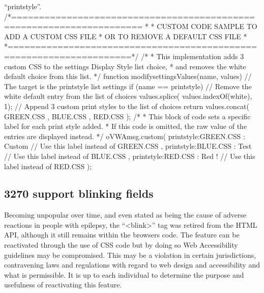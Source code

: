 \documentclass[letterpaper,10pt,english]{sphinxmanual}
\begin{document}
\begin{sphinxVerbatim}[commandchars=\\\{\}]
“printstyle”.
/*=====================================================================
*
* CUSTOM CODE SAMPLE TO ADD A CUSTOM CSS FILE
* OR TO REMOVE A DEFAULT CSS FILE
*
*====================================================================*/
/*
* This implementation adds 3 custom CSS to the settings \PYGZdq{}Display Style\PYGZdq{} list choice,
* and removes the \PYGZdq{}white\PYGZdq{} default choice from this list.
*/
function modify\PYGZus{}settingsValues(name, values) \PYGZob{}
// The target is the \PYGZdq{}printstyle\PYGZdq{} list settings
if (name == \PYGZdq{}printstyle\PYGZdq{}) \PYGZob{}
// Remove the \PYGZdq{}white\PYGZdq{} default entry from the list of choices
values.splice( values.indexOf(\PYGZsq{}white\PYGZsq{}), 1);
// Append 3 custom print styles to the list of choices
return values.concat( \PYGZdq{}GREEN.CSS\PYGZdq{}
, \PYGZdq{}BLUE.CSS\PYGZdq{}
, \PYGZdq{}RED.CSS\PYGZdq{} );
\PYGZcb{}
\PYGZcb{}
/*
* This block of code sets a specific label for each print style added.
* If this code is omitted, the raw value of the entries are displayed instead.
*/
oVWAmsg.custom( \PYGZob{} \PYGZdq{}printstyle:GREEN.CSS\PYGZdq{} : \PYGZdq{}Custom\PYGZdq{} // Use this label instead of \PYGZsq{}GREEN.CSS\PYGZsq{}
, \PYGZdq{}printstyle:BLUE.CSS\PYGZdq{} : \PYGZdq{}Test\PYGZdq{} // Use this label instead of \PYGZsq{}BLUE.CSS\PYGZsq{}
, \PYGZdq{}printstyle:RED.CSS\PYGZdq{} : \PYGZdq{}Red !\PYGZdq{} // Use this label instead of \PYGZsq{}RED.CSS\PYGZsq{}
\PYGZcb{});
\end{sphinxVerbatim}



\subsection{3270 support blinking fields}
\label{\detokenize{User_Guide:support-blinking-fields}}
Becoming unpopular over time, and even stated as being the cause of adverse reactions in people with epilepsy, the
“\textless{}blink\textgreater{}” tag was retired from the HTML API, although it still remains within the browsers code. The feature can be
reactivated through the use of CSS code but by doing so Web Accessibility guidelines may be compromised. This may
be a violation in certain jurisdictions, contravening laws and regulations with regard to web design and accessibility
and what is permissible. It is up to each individual to determine the purpose and usefulness of reactivating this
feature.
\end{document}
